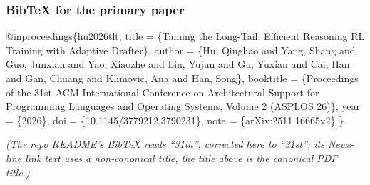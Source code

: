 \documentclass[
  11pt,
  letterpaper,
]{article}
\newenvironment{Shaded}{}{}
\newcommand{\DataTypeTok}[1]{\textcolor[rgb]{0.56,0.13,0.00}{#1}}
\newcommand{\NormalTok}[1]{#1}
\newcommand{\OtherTok}[1]{\textcolor[rgb]{0.00,0.44,0.13}{#1}}
\newcommand{\VariableTok}[1]{\textcolor[rgb]{0.10,0.09,0.49}{#1}}
\begin{document}
\subsubsection{BibTeX for the primary
paper}\label{bibtex-for-the-primary-paper}

\begin{Shaded}
\begin{Highlighting}[]
\VariableTok{@inproceedings}\NormalTok{\{}\OtherTok{hu2026tlt}\NormalTok{,}
  \DataTypeTok{title}\NormalTok{     = \{Taming the Long{-}Tail: Efficient Reasoning RL Training with Adaptive Drafter\},}
  \DataTypeTok{author}\NormalTok{    = \{Hu, Qinghao and Yang, Shang and Guo, Junxian and Yao, Xiaozhe and}
\NormalTok{               Lin, Yujun and Gu, Yuxian and Cai, Han and Gan, Chuang and}
\NormalTok{               Klimovic, Ana and Han, Song\},}
  \DataTypeTok{booktitle}\NormalTok{ = \{Proceedings of the 31st ACM International Conference on Architectural}
\NormalTok{               Support for Programming Languages and Operating Systems, Volume 2 (ASPLOS \textquotesingle{}26)\},}
  \DataTypeTok{year}\NormalTok{      = \{2026\},}
  \DataTypeTok{doi}\NormalTok{       = \{10.1145/3779212.3790231\},}
  \DataTypeTok{note}\NormalTok{      = \{arXiv:2511.16665v2\}}
\NormalTok{\}}
\end{Highlighting}
\end{Shaded}

\emph{(The repo README's BibTeX reads ``31th'', corrected here to
``31st''; its News-line link text uses a non-canonical title, the title
above is the canonical PDF title.)}
\end{document}
